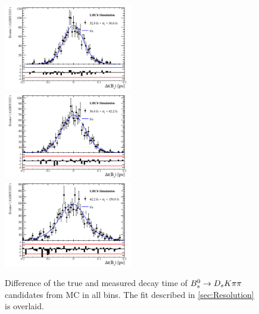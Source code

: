 \begin{figure}[h]
\includegraphics[height=!,width=0.5\textwidth]{figs/Resolution/SignalMC_bin_6.pdf}
\includegraphics[height=!,width=0.5\textwidth]{figs/Resolution/SignalMC_bin_7.pdf}
\includegraphics[height=!,width=0.5\textwidth]{figs/Resolution/SignalMC_bin_8.pdf}
\caption{Difference of the true and measured decay time of ${{B}^0_{s}}\rightarrow{\ensuremath{{D}_{s}}}{\ensuremath{K}}{\ensuremath{\pi}}{\ensuremath{\pi}}$ candidates from MC in all bins. The fit described in \ref{sec:Resolution} is overlaid.}
\label{fig:massfits_signal_Run2}
\end{figure}
